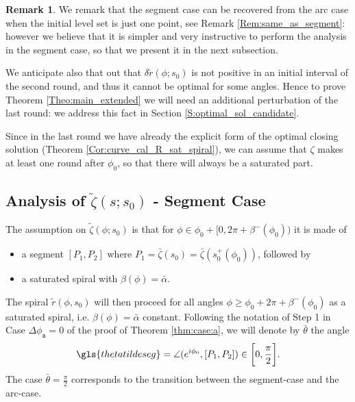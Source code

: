 \documentclass[reqno]{amsart}
\newcounter{assu}
\theoremstyle{definition} \newtheorem{definition}{Definition}[section]
\theoremstyle{definition} \newtheorem{remark}[definition]{Remark}
\theoremstyle{plain} \newtheorem{lemma}[definition]{Lemma}
\theoremstyle{plain} \newtheorem{proposition}[definition]{Proposition}
\theoremstyle{plain} \newtheorem{theorem}[definition]{Theorem}
\theoremstyle{plain} \newtheorem{corollary}[definition]{Corollary}
\theoremstyle{definition} \newtheorem{example}[definition]{Example}
\theoremstyle{plain} \newtheorem{claim}[clai]{Claim}
\theoremstyle{definition} \newtheorem{assumption}[definition]{Assumption}
\theoremstyle{definition} \newtheorem{observation}[definition]{Observation}
\newcommand{\1}{\mathbbm 1}
\numberwithin{equation}{section} %
\theoremstyle{plain} \newtheorem*{theorem*}{Theorem}
\theoremstyle{plain} \newtheorem{mthm}[maintheorem]{Main Theorem}
\theoremstyle{plain} \newtheorem*{mthm*}{Main Theorem}
\theoremstyle{plain} \newtheorem*{conjecture*}{Conjecture}
\theoremstyle{plain} \newtheorem{conjecture}[definition]{Conjecture}
\theoremstyle{plain} \newtheorem*{problem*}{Problem}
\begin{document}
\begin{remark}
\label{Rem:segmet_sub_arc0}
We remark that the segment case can be recovered from the arc case when the initial level set is just one point, see Remark \ref{Rem:same_as_segment}: however we believe that it is simpler and very instructive to perform the analysis in the segment case, so that we present it in the next subsection.

We anticipate also that out that $\delta \tilde r(\phi;s_0)$ is not positive in an initial interval of the second round, and thus it cannot be optimal for some angles. Hence to prove Theorem \ref{Theo:main_extended} we will need an additional perturbation of the last round: we address this fact in Section \ref{S:optimal_sol_candidate}.
\end{remark}

Since in the last round we have already the explicit form of the optimal closing solution (Theorem \ref{Cor:curve_cal_R_sat_spiral}), we can assume that $\zeta$ makes at least one round after $\phi_0$, so that there will always be a saturated part.


\subsection{Analysis of \texorpdfstring{$\tilde \zeta(s;s_0)$}{tildezeta(s;s0)} - Segment Case}
\label{S:segment}


The assumption on $\tilde \zeta(\phi;s_0)$ is that for $\phi \in \phi_0 + [0,2\pi + \beta^-(\phi_0))$ it is made of
\begin{itemize}
\item a segment $[P_1,P_2]$ where $P_1 = \bar \zeta(s_0) = \bar \zeta(s^+_0(\phi_0))$, followed by
\item a saturated spiral with $\beta(\phi) = \bar \alpha$.
\end{itemize}
The spiral $\tilde r(\phi,s_0)$ will then proceed for all angles $\phi \geq \phi_0 + 2\pi + \beta^-(\phi_0)$ as a saturated spiral, i.e. $\beta(\phi) = \bar \alpha$ constant. Following the notation of Step 1 in Case $\Delta \phi_\mathtt a = 0$ of the proof of Theorem \ref{thm:case:a}, we will denote by $\bar \theta$ the angle 
\begin{equation*}
\gls{thetatildeseg} = \angle(e^{i\phi_0},[P_1,P_2]) \in \bigg[ 0,\frac{\pi}{2} \bigg].
\end{equation*}
The case $\bar \theta = \frac{\pi}{2}$ corresponds to the transition between the segment-case and the arc-case.
\end{document}
